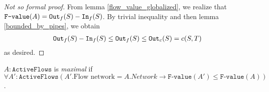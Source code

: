 \documentclass{article}
\begin{document}
\begin{proof}[Not so formal proof]
    From lemma \ref{flow_value_globalized}, we realize that $\texttt{F-value}(A) = \texttt{Out}_f(S) - \texttt{In}_f(S)$. By trivial inequality and then lemma \ref{bounded_by_pipes}, we obtain \begin{align*}
        \texttt{Out}_f(S) - \texttt{In}_f(S) \leq \texttt{Out}_f(S) \leq \texttt{Out}_c(S) = c(S, T)
    \end{align*}
    as desired.
\end{proof}

\begin{definition}
    $A : \texttt{ActiveFlows}$ is \textit{maximal} if $\forall A': \texttt{ActiveFlows} (A'.\text{Flow network} = A.Network \to \texttt{F-value}(A') \leq \texttt{F-value}(A))$.
\end{definition}
\end{document}
